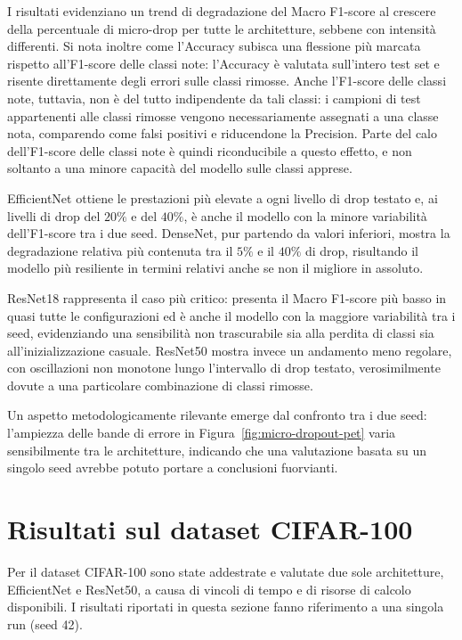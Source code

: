 \FloatBarrier
I risultati evidenziano un trend di degradazione del Macro F1-score al crescere della percentuale di micro-drop per tutte le architetture, sebbene con intensità differenti. 
Si nota inoltre come l'Accuracy subisca una flessione più marcata rispetto all'F1-score delle classi note: l'Accuracy è valutata sull'intero test set e risente direttamente degli errori sulle classi rimosse. Anche l'F1-score delle classi note, tuttavia, non è del tutto indipendente da tali classi: i campioni di test appartenenti alle classi rimosse vengono necessariamente assegnati a una classe nota, comparendo come falsi positivi e riducendone la Precision. Parte del calo dell'F1-score delle classi note è quindi riconducibile a questo effetto, e non soltanto a una minore capacità del modello sulle classi apprese.

EfficientNet ottiene le prestazioni più elevate a ogni livello di drop testato e, ai livelli di drop del $20\%$ e del $40\%$, è anche il modello con la minore variabilità dell'F1-score tra i due seed. 
DenseNet, pur partendo da valori inferiori, mostra la degradazione relativa più contenuta tra il $5\%$ e il $40\%$ di drop, risultando il modello più resiliente in termini relativi anche se non il migliore in assoluto.

ResNet18 rappresenta il caso più critico: presenta il Macro F1-score più basso in quasi tutte le configurazioni ed è anche il modello con la maggiore variabilità tra i seed, evidenziando una sensibilità non trascurabile sia alla perdita di classi 
sia all'inizializzazione casuale. ResNet50 mostra invece un andamento meno regolare, con oscillazioni non monotone lungo l'intervallo di drop testato, verosimilmente dovute a una particolare combinazione di classi rimosse.

Un aspetto metodologicamente rilevante emerge dal confronto tra i due seed: l'ampiezza delle bande di errore in Figura~\ref{fig:micro-dropout-pet} varia sensibilmente tra le architetture, indicando che 
una valutazione basata su un singolo seed avrebbe potuto portare a conclusioni fuorvianti.
\clearpage

\section{Risultati sul dataset CIFAR-100}
\label{sec:cifar100}

Per il dataset CIFAR-100 sono state addestrate e valutate due sole architetture, EfficientNet e ResNet50, a causa di vincoli di tempo e di risorse di calcolo disponibili. 
I risultati riportati in questa sezione fanno riferimento a una singola run (seed 42).

